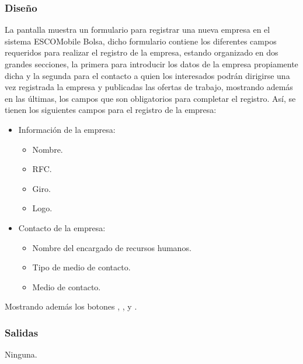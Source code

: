 \subsubsection{Diseño}
	\noindent
	La pantalla muestra un formulario para registrar una nueva empresa en el sistema ESCOMobile Bolsa, dicho formulario contiene los diferentes campos requeridos para realizar el registro de la empresa, estando organizado en dos grandes secciones, la primera para introducir los datos de la empresa propiamente dicha y la segunda para el contacto a quien los interesados podrán dirigirse una vez registrada la empresa y publicadas las ofertas de trabajo, mostrando además en las últimas, los campos que son obligatorios para completar el registro. Así, se tienen los siguientes campos para el registro de la empresa:
	\begin{itemize}
		\item Información de la empresa:
		\begin{itemize}
			\item Nombre.
			\item RFC.
			\item Giro.
			\item Logo.
		\end{itemize}
		\item Contacto de la empresa:
		\begin{itemize}
			\item Nombre del encargado de recursos humanos.
			\item Tipo de medio de contacto. 
			\item Medio de contacto. 
		\end{itemize}
	\end{itemize}
	Mostrando además los botones , \IUbutton{+},  y .

\pagebreak
{}

\subsubsection{Salidas}
	\noindent
	Ninguna.

